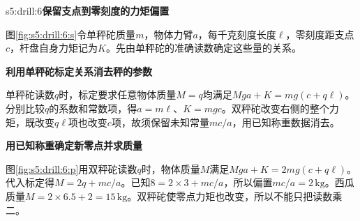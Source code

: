 \begin{drillsolution}{s5:drill:6}\textbf{保留支点到零刻度的力矩偏置}\par\nobreak
图\ref{fig:s5:drill:6:s}令单秤砣质量$m$，物体力臂$a$，每千克刻度长度$\ell$，零刻度距支点$c$，杆盘自身力矩记为$K$。先由单秤砣的准确读数确定这些量的关系。


\par\medskip{}\noindent\textbf{利用单秤砣标定关系消去秤的参数}\par\nobreak
单秤砣读数$q$时，标定要求任意物体质量$M=q$均满足$Mga+K=mg(c+q\ell)$。分别比较$q$的系数和常数项，得$a=m\ell$、$K=mgc$。双秤砣改变右侧的整个力矩，既改变$q\ell$项也改变$c$项，故须保留未知常量$mc/a$，用已知称重数据消去。



\par\medskip{}\noindent\textbf{用已知称重确定新零点并求质量}\par\nobreak
图\ref{fig:s5:drill:6:p}用双秤砣读数$q$时，物体质量$M$满足$Mga+K=2mg(c+q\ell)$。代入标定得$M=2q+mc/a$。已知$8=2\times3+mc/a$，所以偏置$mc/a=2\,\mathrm{kg}$。西瓜质量$M=2\times6.5+2=15\,\mathrm{kg}$。双秤砣使零点力矩也改变，所以不能只把读数乘二。\end{drillsolution}
